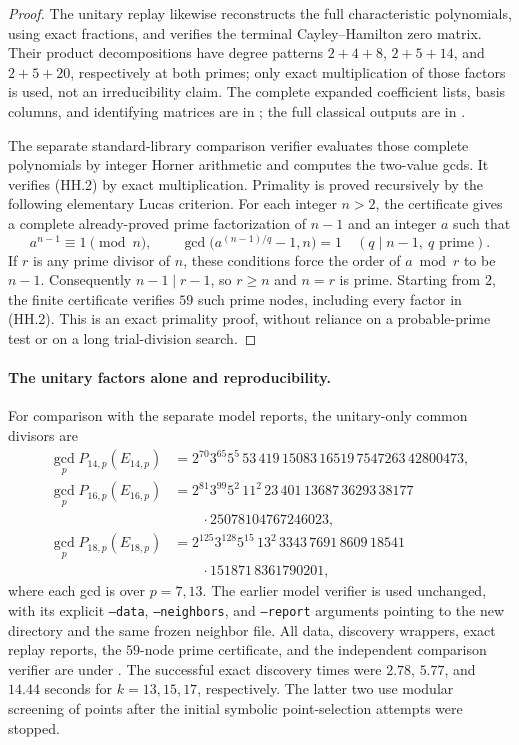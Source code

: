 \begin{proof}
The unitary replay likewise reconstructs the full characteristic
polynomials, using exact fractions, and verifies the terminal
Cayley--Hamilton zero matrix. Their product decompositions have
degree patterns \(2+4+8\), \(2+5+14\), and \(2+5+20\), respectively
at both primes; only exact multiplication of those factors is used,
not an irreducibility claim. The complete expanded coefficient lists,
basis columns, and identifying matrices are in
;
the full classical outputs are in
.

The separate standard-library comparison verifier evaluates those
complete polynomials by integer Horner arithmetic and computes the
two-value gcds. It verifies (HH.2) by exact multiplication.
Primality is proved recursively by the following elementary Lucas
criterion. For each integer \(n>2\), the certificate gives a complete
already-proved prime factorization of \(n-1\) and an integer \(a\)
such that
\[
 a^{n-1}\equiv1\pmod n,\qquad
 \gcd\bigl(a^{(n-1)/q}-1,n\bigr)=1
 \quad(q\mid n-1,\ q\text{ prime}).
\]
If \(r\) is any prime divisor of \(n\), these conditions force the
order of \(a\bmod r\) to be \(n-1\). Consequently \(n-1\mid r-1\),
so \(r\ge n\) and \(n=r\) is prime. Starting from \(2\), the finite
certificate verifies \(59\) such prime nodes, including every factor
in (HH.2). This is an exact primality proof, without reliance on a
probable-prime test or on a long trial-division search.
\end{proof}

\paragraph{The unitary factors alone and reproducibility.}
For comparison with the separate model reports, the unitary-only
common divisors are
\[
\begin{aligned}
\gcd_p P_{14,p}(E_{14,p})
 &=2^{70}3^{65}5^5\,53\,419\,15083\,16519\,7547263\,42800473,\\
\gcd_p P_{16,p}(E_{16,p})
 &=2^{81}3^{99}5^2\,11^2\,23\,401\,13687\,36293\,38177\\
 &\qquad{}\cdot25078104767246023,\\
\gcd_p P_{18,p}(E_{18,p})
 &=2^{125}3^{128}5^{15}\,13^2\,3343\,7691\,8609\,18541\\
 &\qquad{}\cdot151871\,8361790201,
\end{aligned}
\tag{HH.3}
\]
where each gcd is over \(p=7,13\).
The earlier model verifier is used unchanged, with its explicit
\texttt{--data}, \texttt{--neighbors}, and \texttt{--report} arguments
pointing to the new directory and the same frozen neighbor file.
All data, discovery wrappers, exact replay reports, the \(59\)-node
prime certificate, and the independent comparison verifier are under
.
The successful exact discovery times were \(2.78\), \(5.77\), and
\(14.44\) seconds for \(k=13,15,17\), respectively. The latter two
use modular screening of points after the initial symbolic
point-selection attempts were stopped.

